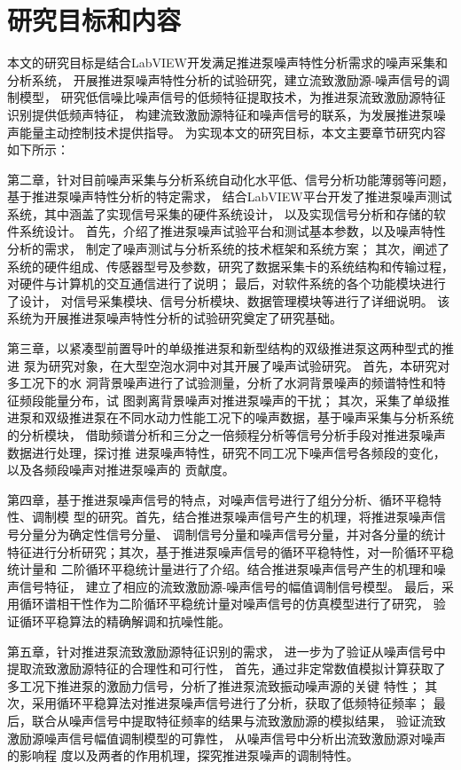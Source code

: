 \section{研究目标和内容}
本文的研究目标是结合LabVIEW开发满足推进泵噪声特性分析需求的噪声采集和分析系统，
开展推进泵噪声特性分析的试验研究，建立流致激励源-噪声信号的调制模型，
研究低信噪比噪声信号的低频特征提取技术，为推进泵流致激励源特征识别提供低频声特征，
构建流致激励源特征和噪声信号的联系，为发展推进泵噪声能量主动控制技术提供指导。
为实现本文的研究目标，本文主要章节研究内容如下所示：

第二章，针对目前噪声采集与分析系统自动化水平低、信号分析功能薄弱等问题，基于推进泵噪声特性分析的特定需求，
结合LabVIEW平台开发了推进泵噪声测试系统，其中涵盖了实现信号采集的硬件系统设计，
以及实现信号分析和存储的软件系统设计。
首先，介绍了推进泵噪声试验平台和测试基本参数，以及噪声特性分析的需求，
制定了噪声测试与分析系统的技术框架和系统方案；
其次，阐述了系统的硬件组成、传感器型号及参数，研究了数据采集卡的系统结构和传输过程，
对硬件与计算机的交互通信进行了说明；
最后，对软件系统的各个功能模块进行了设计，
对信号采集模块、信号分析模块、数据管理模块等进行了详细说明。
该系统为开展推进泵噪声特性分析的试验研究奠定了研究基础。

第三章，以紧凑型前置导叶的单级推进泵和新型结构的双级推进泵这两种型式的推进
泵为研究对象，在大型空泡水洞中对其开展了噪声试验研究。
首先，本研究对多工况下的水
洞背景噪声进行了试验测量，分析了水洞背景噪声的频谱特性和特征频段能量分布，试
图剥离背景噪声对推进泵噪声的干扰；
其次，采集了单级推进泵和双级推进泵在不同水动力性能工况下的噪声数据，基于噪声采集与分析系统的分析模块，
借助频谱分析和三分之一倍频程分析等信号分析手段对推进泵噪声数据进行处理，探讨推
进泵噪声特性，研究不同工况下噪声信号各频段的变化，以及各频段噪声对推进泵噪声的
贡献度。

第四章，基于推进泵噪声信号的特点，对噪声信号进行了组分分析、循环平稳特性、调制模
型的研究。首先，结合推进泵噪声信号产生的机理，将推进泵噪声信号分量分为确定性信号分量、
调制信号分量和噪声信号分量，并对各分量的统计
特征进行分析研究；其次，基于推进泵噪声信号的循环平稳特性，对一阶循环平稳统计量和
二阶循环平稳统计量进行了介绍。结合推进泵噪声信号产生的机理和噪声信号特征，
建立了相应的流致激励源-噪声信号的幅值调制信号模型。
最后，采用循环谱相干性作为二阶循环平稳统计量对噪声信号的仿真模型进行了研究，
验证循环平稳算法的精确解调和抗噪性能。

第五章，针对推进泵流致激励源特征识别的需求，
进一步为了验证从噪声信号中提取流致激励源特征的合理性和可行性，
首先，通过非定常数值模拟计算获取了多工况下推进泵的激励力信号，分析了推进泵流致振动噪声源的关键
特性；
其次，采用循环平稳算法对推进泵噪声信号进行了分析，获取了低频特征频率；
最后，联合从噪声信号中提取特征频率的结果与流致激励源的模拟结果，
验证流致激励源­噪声信号幅值调制模型的可靠性，
从噪声信号中分析出流致激励源对噪声的影响程
度以及两者的作用机理，探究推进泵噪声的调制特性。


